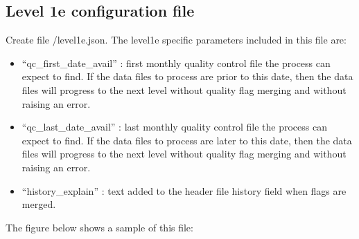 \documentclass[letterpaper,10pt,english]{sphinxmanual}
\begin{document}
\subsection{Level 1e configuration file}
\label{\detokenize{index:level-1e-configuration-file}}\label{\detokenize{index:level1e-config-file}}
Create file /level1e.json. The level1e specific parameters
included in this file are:
\begin{itemize}
\item {} 
“qc\_first\_date\_avail” : first monthly quality control file the process can
expect to find. If the data files to process are prior to this date, then
the data files will progress to the next level without quality flag merging
and without raising an error.

\item {} 
“qc\_last\_date\_avail” : last monthly quality control file the process can
expect to find. If the data files to process are later to this date, then
the data files will progress to the next level without quality flag merging
and without raising an error.

\item {} 
“history\_explain” : text added to the header file history field when flags are
merged.

\end{itemize}

The figure below shows a sample of this file:

\begin{sphinxVerbatim}[commandchars=\\\{\}]
   
   
   
    
   
    
\end{sphinxVerbatim}
\end{document}
